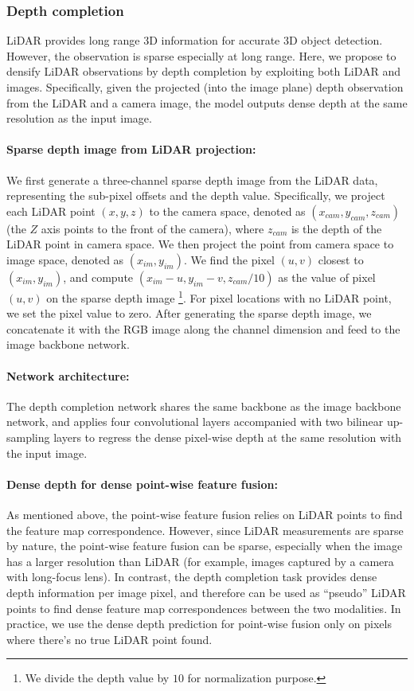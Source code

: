 \documentclass[10pt,twocolumn,letterpaper]{article}
\begin{document}
\subsubsection{Depth completion}
LiDAR provides long range 3D information for accurate 3D object detection. However, the observation is  sparse especially at long range. Here, we propose to densify LiDAR observations by depth completion by exploiting both LiDAR and  images. Specifically, 
given the projected (into the image plane) depth observation from the LiDAR and a camera image, the model outputs
dense depth at the same resolution as the input image.

\paragraph{Sparse depth image from LiDAR projection:}
We first generate a three-channel sparse depth image from the LiDAR data, representing the sub-pixel offsets and the depth value. Specifically, we  project each LiDAR point $(x, y, z)$ to the camera space, denoted as $(x_{cam}, y_{cam}, z_{cam})$ (the $Z$ axis points to the front of the camera), where $z_{cam}$ is the depth of the LiDAR point in camera space. We then project the point from camera space to image space, denoted as $(x_{im}, y_{im})$. We find the pixel $(u, v)$ closest to $(x_{im}, y_{im})$, and compute $(x_{im} - u, y_{im} - v, z_{cam}/10)$ as the value of pixel $(u, v)$ on the sparse depth image \footnote{We divide the depth value by $10$ for normalization purpose.}. 
For pixel locations with no LiDAR point, we set the pixel value to zero. After generating the sparse depth image, we concatenate it with the RGB image along the channel dimension and feed to the image backbone network.

\paragraph{Network architecture:}
The depth completion network shares the same backbone as the image backbone network, and applies four convolutional layers accompanied with two bilinear up-sampling layers to regress the dense pixel-wise depth at the same resolution with the input image.

\paragraph{Dense depth for dense point-wise feature fusion:}
As mentioned above, the point-wise feature fusion relies on LiDAR points to find the feature map correspondence. However, since LiDAR measurements are sparse by nature, the point-wise feature fusion can be sparse, especially when the image has a larger resolution than LiDAR (for example, images captured by a camera with long-focus lens). In contrast, the depth completion task provides dense depth information per image pixel, and therefore can be used as ``pseudo'' LiDAR points to find dense feature map correspondences between the two modalities. In practice, we use the dense depth prediction for point-wise fusion only on pixels where there's no true LiDAR point found. 
\end{document}
